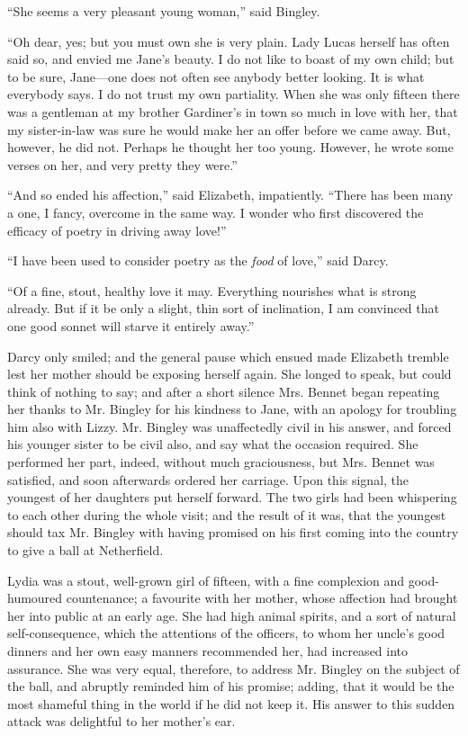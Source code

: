 \documentclass[12pt]{book}
\begin{document}
``She seems a very pleasant young woman,'' said Bingley.

``Oh dear, yes; but you must own she is very plain. Lady Lucas herself has often said so, and envied me Jane's beauty. I do not like to boast of my own child; but to be sure, Jane---one does not often see anybody better looking. It is what everybody says. I do not trust my own partiality. When she was only fifteen there was a gentleman at my brother Gardiner's in town so much in love with her, that my sister-in-law was sure he would make her an offer before we came away. But, however, he did not. Perhaps he thought her too young. However, he wrote some verses on her, and very pretty they were.''

``And so ended his affection,'' said Elizabeth, impatiently. ``There has been many a one, I fancy, overcome in the same way. I wonder who first discovered the efficacy of poetry in driving away love!''

``I have been used to consider poetry as the \textit{food} of love,'' said Darcy.

``Of a fine, stout, healthy love it may. Everything nourishes what is strong already. But if it be only a slight, thin sort of inclination, I am convinced that one good sonnet will starve it entirely away.''

Darcy only smiled; and the general pause which ensued made Elizabeth tremble lest her mother should be exposing herself again. She longed to speak, but could think of nothing to say; and after a short silence Mrs. Bennet began repeating her thanks to Mr. Bingley for his kindness to Jane, with an apology for troubling him also with Lizzy. Mr. Bingley was unaffectedly civil in his answer, and forced his younger sister to be civil also, and say what the occasion required. She performed her part, indeed, without much graciousness, but Mrs. Bennet was satisfied, and soon afterwards ordered her carriage. Upon this signal, the youngest of her daughters put herself forward. The two girls had been whispering to each other during the whole visit; and the result of it was, that the youngest should tax Mr. Bingley with having promised on his first coming into the country to give a ball at Netherfield.

Lydia was a stout, well-grown girl of fifteen, with a fine complexion and good-humoured countenance; a favourite with her mother, whose affection had brought her into public at an early age. She had high animal spirits, and a sort of natural self-consequence, which the attentions of the officers, to whom her uncle's good dinners and her own easy manners recommended her, had increased into assurance. She was very equal, therefore, to address Mr. Bingley on the subject of the ball, and abruptly reminded him of his promise; adding, that it would be the most shameful thing in the world if he did not keep it. His answer to this sudden attack was delightful to her mother's ear.
\end{document}
